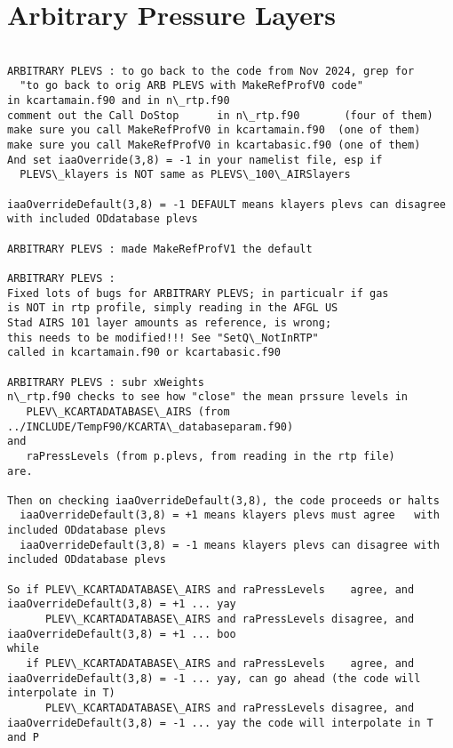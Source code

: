 \documentclass[12pt]{article}
\begin{document}
{{{{\section{Arbitrary Pressure Layers}

\begin{verbatim}

ARBITRARY PLEVS : to go back to the code from Nov 2024, grep for 
  "to go back to orig ARB PLEVS with MakeRefProfV0 code"
in kcartamain.f90 and in n\_rtp.f90
comment out the Call DoStop      in n\_rtp.f90       (four of them)
make sure you call MakeRefProfV0 in kcartamain.f90  (one of them)
make sure you call MakeRefProfV0 in kcartabasic.f90 (one of them)
And set iaaOverride(3,8) = -1 in your namelist file, esp if 
  PLEVS\_klayers is NOT same as PLEVS\_100\_AIRSlayers

iaaOverrideDefault(3,8) = -1 DEFAULT means klayers plevs can disagree with included ODdatabase plevs

ARBITRARY PLEVS : made MakeRefProfV1 the default 

ARBITRARY PLEVS : 
Fixed lots of bugs for ARBITRARY PLEVS; in particualr if gas
is NOT in rtp profile, simply reading in the AFGL US
Stad AIRS 101 layer amounts as reference, is wrong;
this needs to be modified!!! See "SetQ\_NotInRTP"
called in kcartamain.f90 or kcartabasic.f90

ARBITRARY PLEVS : subr xWeights
n\_rtp.f90 checks to see how "close" the mean prssure levels in 
   PLEV\_KCARTADATABASE\_AIRS (from ../INCLUDE/TempF90/KCARTA\_databaseparam.f90) 
and
   raPressLevels (from p.plevs, from reading in the rtp file)
are. 

Then on checking iaaOverrideDefault(3,8), the code proceeds or halts
  iaaOverrideDefault(3,8) = +1 means klayers plevs must agree   with included ODdatabase plevs
  iaaOverrideDefault(3,8) = -1 means klayers plevs can disagree with included ODdatabase plevs

So if PLEV\_KCARTADATABASE\_AIRS and raPressLevels    agree, and iaaOverrideDefault(3,8) = +1 ... yay
      PLEV\_KCARTADATABASE\_AIRS and raPressLevels disagree, and iaaOverrideDefault(3,8) = +1 ... boo
while
   if PLEV\_KCARTADATABASE\_AIRS and raPressLevels    agree, and iaaOverrideDefault(3,8) = -1 ... yay, can go ahead (the code will interpolate in T)
      PLEV\_KCARTADATABASE\_AIRS and raPressLevels disagree, and iaaOverrideDefault(3,8) = -1 ... yay the code will interpolate in T and P
\end{verbatim}


}}}}
\end{document}
